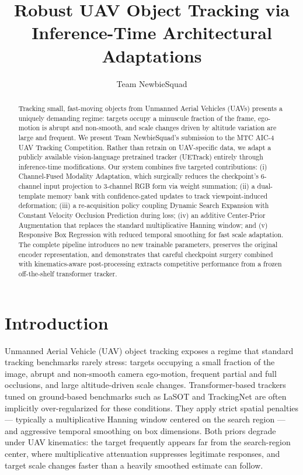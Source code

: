 \documentclass[10pt,twocolumn,letterpaper]{article}
\begin{document}
\title{Robust UAV Object Tracking via Inference-Time Architectural Adaptations}

\author{
Team NewbieSquad
}

\date{}

\maketitle

\begin{abstract}
Tracking small, fast-moving objects from Unmanned Aerial Vehicles (UAVs) presents a uniquely demanding regime: targets occupy a minuscule fraction of the frame, ego-motion is abrupt and non-smooth, and scale changes driven by altitude variation are large and frequent. We present Team NewbieSquad's submission to the MTC AIC-4 UAV Tracking Competition. Rather than retrain on UAV-specific data, we adapt a publicly available vision-language pretrained tracker (UETrack) entirely through inference-time modifications. Our system combines five targeted contributions: (i) Channel-Fused Modality Adaptation, which surgically reduces the checkpoint's 6-channel input projection to 3-channel RGB form via weight summation; (ii) a dual-template memory bank with confidence-gated updates to track viewpoint-induced deformation; (iii) a re-acquisition policy coupling Dynamic Search Expansion with Constant Velocity Occlusion Prediction during loss; (iv) an additive Center-Prior Augmentation that replaces the standard multiplicative Hanning window; and (v) Responsive Box Regression with reduced temporal smoothing for fast scale adaptation. The complete pipeline introduces no new trainable parameters, preserves the original encoder representation, and demonstrates that careful checkpoint surgery combined with kinematics-aware post-processing extracts competitive performance from a frozen off-the-shelf transformer tracker.
\end{abstract}

\section{Introduction}

Unmanned Aerial Vehicle (UAV) object tracking exposes a regime that standard tracking benchmarks rarely stress: targets occupying a small fraction of the image, abrupt and non-smooth camera ego-motion, frequent partial and full occlusions, and large altitude-driven scale changes. Transformer-based trackers tuned on ground-based benchmarks such as LaSOT and TrackingNet are often implicitly over-regularized for these conditions. They apply strict spatial penalties --- typically a multiplicative Hanning window centered on the search region --- and aggressive temporal smoothing on box dimensions. Both priors degrade under UAV kinematics: the target frequently appears far from the search-region center, where multiplicative attenuation suppresses legitimate responses, and target scale changes faster than a heavily smoothed estimate can follow.
\end{document}

